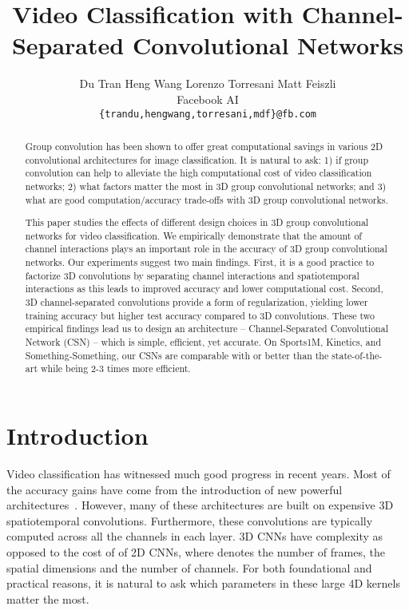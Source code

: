 \documentclass[10pt,twocolumn,letterpaper]{article}
\begin{document}
\title{Video Classification with Channel-Separated Convolutional Networks}

\author{Du Tran \qquad Heng Wang \qquad Lorenzo Torresani  \qquad Matt Feiszli\\Facebook AI\\
{\tt\small \{trandu,hengwang,torresani,mdf\}@fb.com}
}

\maketitle



\begin{abstract}

Group convolution has been shown to offer great computational savings in various 2D convolutional architectures for image classification. It is natural to ask: 1) if group convolution can help to alleviate the high computational cost of video classification networks; 2) what factors matter the most in 3D group convolutional networks; and 3) what are good computation/accuracy trade-offs with 3D group convolutional networks.

This paper studies the effects of different design choices in 3D group convolutional networks for video classification. We empirically demonstrate that the amount of channel interactions plays an important role in the accuracy of 3D group convolutional networks. Our experiments suggest two main findings. First, it is a good practice to factorize 3D convolutions by separating channel interactions and spatiotemporal interactions as this leads to improved accuracy and lower computational cost. Second, 3D channel-separated convolutions provide a form of regularization, yielding lower training accuracy but higher test accuracy compared to 3D convolutions. These two empirical findings lead us to design an architecture --  Channel-Separated Convolutional Network (CSN) -- which is simple, efficient, yet accurate. On Sports1M, Kinetics, and Something-Something, our CSNs are comparable with or better than the state-of-the-art while being 2-3 times more efficient.

\end{abstract} 
\section{Introduction}
\label{sec:intro}

Video classification has witnessed much good progress in recent years. Most of the accuracy gains have come from the introduction of new powerful architectures~\cite{I3D,Tran18,P3D,xie2017rethinking,XiaolongWang18}. However, many of these architectures are built on expensive 3D spatiotemporal convolutions.  Furthermore,  these convolutions are typically computed across all the channels in each layer. 3D CNNs have complexity  as opposed to the cost of  of 2D CNNs, where  denotes the number of frames,  the spatial dimensions and  the number of channels.  For both foundational and practical reasons, it is natural to ask which parameters in these large 4D kernels matter the most.
\end{document}
